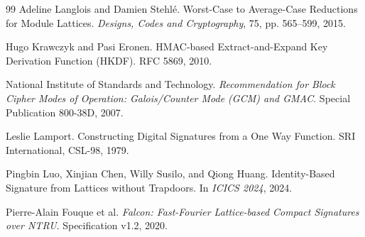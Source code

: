\documentclass[UTF8,a4paper,12pt,oneside,openany,fontset=fandol]{ctexrep}
\begin{document}
\begin{thebibliography}{99}
Adeline Langlois and Damien Stehl\'e.
Worst-Case to Average-Case Reductions for Module Lattices.
\emph{Designs, Codes and Cryptography}, 75, pp. 565--599, 2015.

Hugo Krawczyk and Pasi Eronen.
HMAC-based Extract-and-Expand Key Derivation Function (HKDF).
RFC 5869, 2010.

National Institute of Standards and Technology.
\emph{Recommendation for Block Cipher Modes of Operation: Galois/Counter Mode (GCM) and GMAC}.
Special Publication 800-38D, 2007.

Leslie Lamport.
Constructing Digital Signatures from a One Way Function.
SRI International, CSL-98, 1979.

Pingbin Luo, Xinjian Chen, Willy Susilo, and Qiong Huang.
Identity-Based Signature from Lattices without Trapdoors.
In \emph{ICICS 2024}, 2024.

Pierre-Alain Fouque et al.
\emph{Falcon: Fast-Fourier Lattice-based Compact Signatures over NTRU}.
Specification v1.2, 2020.

\end{thebibliography}
\end{document}
